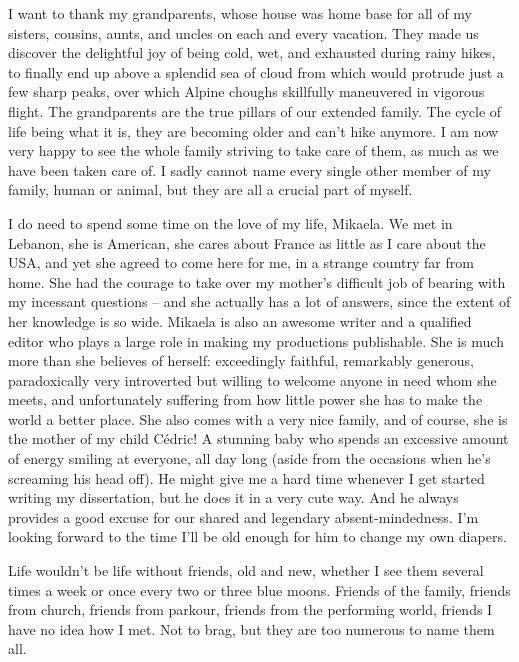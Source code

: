 I want to thank my grandparents, whose house was home base for all of my sisters, cousins, aunts, and uncles on each and every vacation. They made us discover the delightful joy of being cold, wet, and exhausted during rainy hikes, to finally end up above a splendid sea of cloud from which would protrude just a few sharp peaks, over which Alpine choughs skillfully maneuvered in vigorous flight. The grandparents are the true pillars of our extended family. The cycle of life being what it is, they are becoming older and can’t hike anymore. I am now very happy to see the whole family striving to take care of them, as much as we have been taken care of. I sadly cannot name every single other member of my family, human or animal, but they are all a crucial part of myself.

I do need to spend some time on the love of my life, Mikaela. We met in Lebanon, she is American, she cares about France as little as I care about the USA, and yet she agreed to come here for me, in a strange country far from home. She had the courage to take over my mother’s difficult job of bearing with my incessant questions – and she actually has a lot of answers, since the extent of her knowledge is so wide. Mikaela is also an awesome writer and a qualified editor who plays a large role in making my productions publishable. She is much more than she believes of herself: exceedingly faithful, remarkably generous, paradoxically very introverted but willing to welcome anyone in need whom she meets, and unfortunately suffering from how little power she has to make the world a better place. She also comes with a very nice family, and of course, she is the mother of my child Cédric! A stunning baby who spends an excessive amount of energy smiling at everyone, all day long (aside from the occasions when he’s screaming his head off). He might give me a hard time whenever I get started writing my dissertation, but he does it in a very cute way. And he always provides a good excuse for our shared and legendary absent-mindedness. I’m looking forward to the time I’ll be old enough for him to change my own diapers.

Life wouldn’t be life without friends, old and new, whether I see them several times a week or once every two or three blue moons. Friends of the family, friends from church, friends from parkour, friends from the performing world, friends I have no idea how I met. Not to brag, but they are too numerous to name them all.

